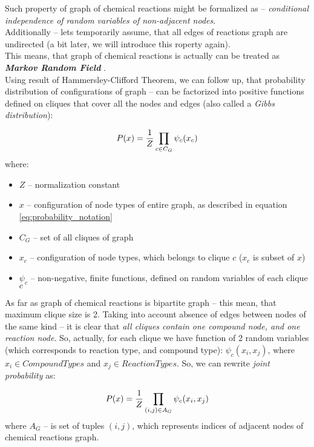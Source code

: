 \documentclass[10pt]{article}
\begin{document}
Such property of graph of chemical reactions might be formalized as -- \emph{conditional independence of random variables of non-adjacent nodes}. \\

Additionally -- lets temporarily assume, that all edges of reactions graph are undirected (a bit later, we will introduce this roperty again). \\

This means, that graph of chemical reactions is actually can be treated as \emph{\textbf{Markov Random Field}} \cite{wikipedia_mrf}.
\\

Using result of Hammersley-Clifford Theorem, we can follow up, that probability distribution of configurations of graph -- can be factorized into positive functions defined on cliques that cover all the nodes and edges (also called a \emph{Gibbs distribution})\cite{hammersley_clifford_proof, wikipedia_hammersley_clifford}:

\begin{equation}
P(x) = {1 \over Z} \prod_{c \in C_G} \psi_{c}(x_c)
\end{equation}
where:
\begin{itemize} 
    \setlength \itemsep{0em}
    \item $Z$ -- normalization constant
    \item $x$ -- configuration of node types of entire graph, as described in equation \eqref{eq:probability_notation}
    \item $C_G$ -- set of all cliques of graph
    \item $x_c$ -- configuration of node types, which belongs to clique $c$ ($x_c$ is subset of $x$)
    \item $\psi_{c}$ -- non-negative, finite functions, defined on random variables of each clique $c$
\end{itemize}

\noindent As far as graph of chemical reactions is bipartite graph -- this mean, that maximum clique size is 2. Taking into account absence of edges between nodes of the same kind -- it is clear that \emph{all cliques contain one compound node, and one reaction node}. So, actually, for each clique we have function of 2 random variables (which corresponds to reaction type, and compound type): $\psi_c(x_i, x_j)$, where $x_i \in CompoundTypes$ and $x_j \in ReactionTypes$. So, we can rewrite \emph{joint probability} as:

\begin{equation} \label{eq:pairwise_gibbs_distribution}
P(x) = {1 \over Z} \prod_{(i,j) \in A_G} \psi_{c}(x_i, x_j)
\end{equation}
where $A_G$ -- is set of tuples $(i,j)$, which represents indices of adjacent nodes of chemical reactions graph. \\
\end{document}
